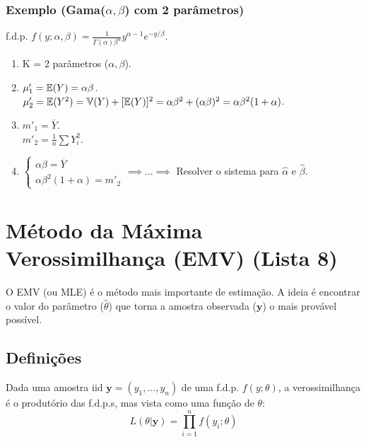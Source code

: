 \subsubsection{Exemplo (Gama($\alpha, \beta$) com 2 parâmetros)}
f.d.p. $f(y; \alpha, \beta) = \frac{1}{\Gamma(\alpha)\beta^\alpha} y^{\alpha-1} e^{-y/\beta}$.
\begin{enumerate}
    \item K = 2 parâmetros ($\alpha, \beta$).
    \item $\mu'_1 = \mathbb{E}(Y) = \alpha\beta$. \\
          $\mu'_2 = \mathbb{E}(Y^2) = \mathbb{V}(Y) + [\mathbb{E}(Y)]^2 = \alpha\beta^2 + (\alpha\beta)^2 = \alpha\beta^2(1+\alpha)$.
    \item $m'_1 = \overline{Y}$. \\
          $m'_2 = \frac{1}{n} \sum Y_i^2$.
    \item $\begin{cases} \alpha\beta = \overline{Y} \\ \alpha\beta^2(1+\alpha) = m'_2 \end{cases} \implies ... \implies$ Resolver o sistema para $\hat{\alpha}$ e $\hat{\beta}$.
\end{enumerate}

\section{Método da Máxima Verossimilhança (EMV) (Lista 8)}
\label{sec:emv}
O EMV (ou MLE) é o método mais importante de estimação. A ideia é encontrar o valor do parâmetro ($\hat{\theta}$) que torna a amostra observada ($\boldsymbol{y}$) o mais provável possível.

\subsection{Definições}
\begin{definicao}
Dada uma amostra iid $\boldsymbol{y} = (y_1, ..., y_n)$ de uma f.d.p. $f(y; \theta)$, a verossimilhança é o produtório das f.d.p.s, mas vista como uma função de $\theta$:
$$ L(\theta | \boldsymbol{y}) = \prod_{i=1}^n f(y_i; \theta) $$
\end{definicao}

